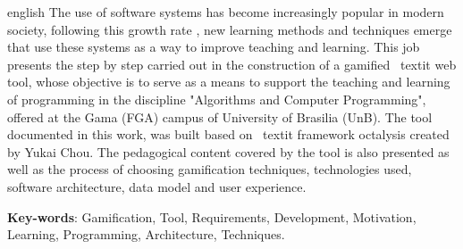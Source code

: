 \begin{resumo}[Abstract]
 \begin{otherlanguage*}{english}
  The use of software systems has become increasingly popular in modern society, following this growth rate
    , new learning methods and techniques emerge that use these systems as a way to improve teaching and learning. This job
    presents the step by step carried out in the construction of a gamified \ textit {web} tool, whose objective is to serve as a means
    to support the teaching and learning of programming in the discipline "Algorithms and Computer Programming", offered at the Gama (FGA) campus of
    University of Brasilia (UnB). The tool documented in this work, was built based on \ textit {framework octalysis} created by Yukai Chou. The pedagogical content covered by the tool is also presented
    as well as the process of choosing gamification techniques, technologies used, software architecture, data model and user experience.
   \vspace{\onelineskip}
 
   \noindent 
   \textbf{Key-words}: Gamification, Tool, Requirements, Development, Motivation, Learning, Programming, Architecture, Techniques.
 \end{otherlanguage*}
\end{resumo}
